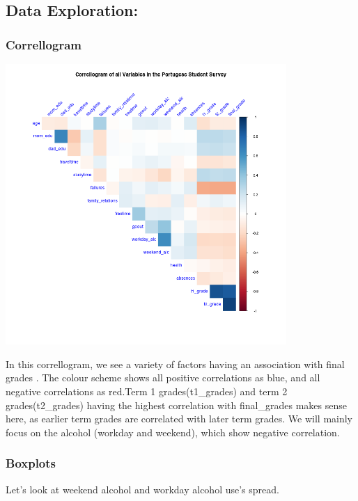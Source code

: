 \documentclass[]{article}
\begin{document}
\hypertarget{data-exploration}{%
\subsection{Data Exploration:}\label{data-exploration}}

\hypertarget{correllogram}{%
\subsubsection{Correllogram}\label{correllogram}}

\includegraphics[width=0.8\textwidth,height=\textheight]{images/Correllogram.png}

In this correllogram, we see a variety of factors having an association
with final grades . The colour scheme shows all positive correlations as
blue, and all negative correlations as red.Term 1 grades(t1\_grades) and
term 2 grades(t2\_grades) having the highest correlation with
final\_grades makes sense here, as earlier term grades are correlated
with later term grades. We will mainly focus on the alcohol (workday and
weekend), which show negative correlation.

\hypertarget{boxplots}{%
\subsubsection{Boxplots}\label{boxplots}}

Let's look at weekend alcohol and workday alcohol use's spread.
\end{document}
